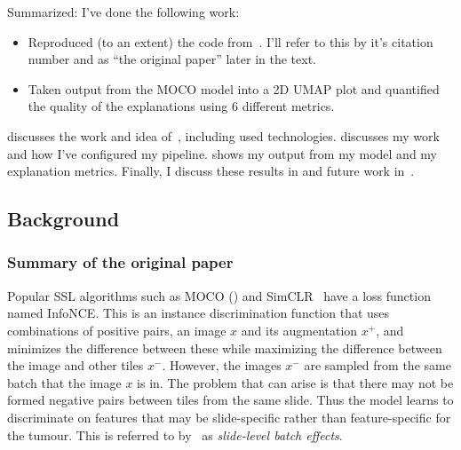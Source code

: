 \documentclass[10pt,twocolumn,letterpaper]{article}
\begin{document}
Summarized: I've done the following work:
\begin{itemize}
  \item Reproduced (to an extent) the code from~\cite{sslUMAP}. I'll refer to this by it's citation number and as ``the original paper'' later in the text.
  \item Taken output from the \gls{MOCO} model into a 2D \gls{UMAP} plot and quantified the quality of the explanations using 6 different metrics.
\end{itemize}

 discusses the work and idea of~\cite{sslUMAP}, including used technologies.  discusses my work and how I've configured my pipeline.  shows my output from my model and my explanation metrics. Finally, I discuss these results in  and future work in~.

\subsection{Background}\label{sec:background}





\subsubsection{Summary of the original paper}
Popular \gls{SSL} algorithms such as \gls{MOCO} () and SimCLR~\cite{simCLR} have a loss function named \gls{InfoNCE}. This is an instance discrimination function that uses combinations of positive pairs, an image $x$ and its augmentation $x^{+}$, and minimizes the difference between these while maximizing the difference between the image and other tiles $x^{-}$. However, the images $x^{-}$ are sampled from the same batch that the image $x$ is in. The problem that can arise is that there may not be formed negative pairs between tiles from the same slide. Thus the model learns to discriminate on features that may be slide-specific rather than feature-specific for the tumour. This is referred to by~\cite{sslUMAP} as \textit{slide-level batch effects}.
\end{document}
